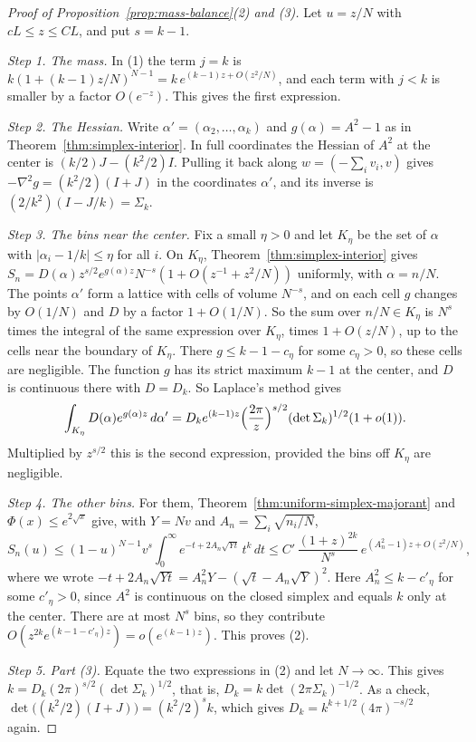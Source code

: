 \begin{proof}[Proof of Proposition~\ref{prop:mass-balance}(2) and (3)]
Let $u=z/N$ with $cL\le z\le CL$, and put $s=k-1$.

\emph{Step 1. The mass.} In (1) the term $j=k$ is
$k(1+(k-1)z/N)^{N-1}=k\,e^{(k-1)z+O(z^2/N)}$, and each term with $j<k$ is smaller
by a factor $O(e^{-z})$. This gives the first expression.

\emph{Step 2. The Hessian.} Write $\alpha'=(\alpha_2,\ldots,\alpha_k)$ and
$g(\alpha)=A^2-1$ as in Theorem~\ref{thm:simplex-interior}. In full coordinates
the Hessian of $A^2$ at the center is $(k/2)J-(k^2/2)I$. Pulling it back along
$w=(-\sum_iv_i,v)$ gives $-\nabla^2g=(k^2/2)(I+J)$ in the coordinates
$\alpha'$, and its inverse is $(2/k^2)(I-J/k)=\Sigma_k$.

\emph{Step 3. The bins near the center.} Fix a small $\eta>0$ and let $K_\eta$ be
the set of $\alpha$ with $|\alpha_i-1/k|\le\eta$ for all $i$. On $K_\eta$,
Theorem~\ref{thm:simplex-interior} gives
$S_n=D(\alpha)z^{s/2}e^{g(\alpha)z}N^{-s}(1+O(z^{-1}+z^2/N))$ uniformly, with
$\alpha=n/N$. The points $\alpha'$ form a lattice with cells of volume $N^{-s}$,
and on each cell $g$ changes by $O(1/N)$ and $D$ by a factor $1+O(1/N)$. So the
sum over $n/N\in K_\eta$ is $N^s$ times the integral of the same expression over
$K_\eta$, times $1+O(z/N)$, up to the cells near the boundary of $K_\eta$. There
$g\le k-1-c_\eta$ for some $c_\eta>0$, so these cells are negligible. The function
$g$ has its strict maximum $k-1$ at the center, and $D$ is continuous there with
$D=D_k$. So Laplace's method gives
\[
\int_{K_\eta}D(\alpha)e^{g(\alpha)z}\,d\alpha'
=D_ke^{(k-1)z}\Bigl(\frac{2\pi}z\Bigr)^{s/2}(\det\Sigma_k)^{1/2}(1+o(1)).
\]
Multiplied by $z^{s/2}$ this is the second expression, provided the bins off
$K_\eta$ are negligible.

\emph{Step 4. The other bins.} For them, Theorem~\ref{thm:uniform-simplex-majorant}
and $\Phi(x)\le e^{2\sqrt x}$ give, with $Y=Nv$ and $A_n=\sum_i\sqrt{n_i/N}$,
\[
S_n(u)\le(1-u)^{N-1}v^s\int_0^\infty e^{-t+2A_n\sqrt{Yt}}\,t^k\,dt
\le C'\,\frac{(1+z)^{2k}}{N^s}\,e^{(A_n^2-1)z+O(z^2/N)},
\]
where we wrote $-t+2A_n\sqrt{Yt}=A_n^2Y-(\sqrt t-A_n\sqrt Y)^2$. Here
$A_n^2\le k-c'_\eta$ for some $c'_\eta>0$, since $A^2$ is continuous on the
closed simplex and equals $k$ only at the center. There are at most $N^s$ bins,
so they contribute $O(z^{2k}e^{(k-1-c'_\eta)z})=o(e^{(k-1)z})$. This proves (2).

\emph{Step 5. Part (3).} Equate the two expressions in (2) and let $N\to\infty$.
This gives $k=D_k(2\pi)^{s/2}(\det\Sigma_k)^{1/2}$, that is,
$D_k=k\det(2\pi\Sigma_k)^{-1/2}$. As a check,
$\det\bigl((k^2/2)(I+J)\bigr)=(k^2/2)^sk$, which gives
$D_k=k^{k+1/2}(4\pi)^{-s/2}$ again.
\end{proof}

